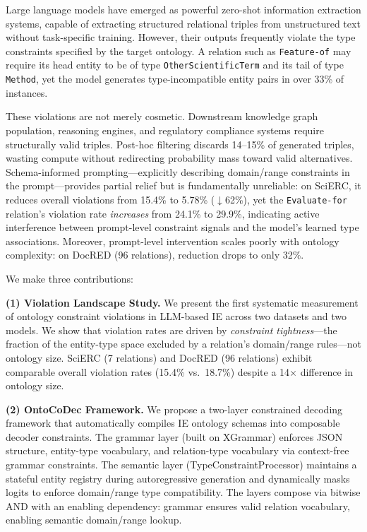 \documentclass[11pt,a4paper]{article}
\newcommand{\sys}{OntoCoDec}
\begin{document}
Large language models have emerged as powerful zero-shot information extraction systems, capable of extracting structured relational triples from unstructured text without task-specific training.
However, their outputs frequently violate the type constraints specified by the target ontology.
A relation such as \texttt{Feature-of} may require its head entity to be of type \texttt{OtherScientificTerm} and its tail of type \texttt{Method}, yet the model generates type-incompatible entity pairs in over 33\% of instances.

These violations are not merely cosmetic. Downstream knowledge graph population, reasoning engines, and regulatory compliance systems require structurally valid triples.
Post-hoc filtering discards 14--15\% of generated triples, wasting compute without redirecting probability mass toward valid alternatives.
Schema-informed prompting---explicitly describing domain/range constraints in the prompt---provides partial relief but is fundamentally unreliable: on SciERC, it reduces overall violations from 15.4\% to 5.78\% ($\downarrow$62\%), yet the \texttt{Evaluate-for} relation's violation rate \emph{increases} from 24.1\% to 29.9\%, indicating active interference between prompt-level constraint signals and the model's learned type associations.
Moreover, prompt-level intervention scales poorly with ontology complexity: on DocRED (96 relations), reduction drops to only 32\%.

We make three contributions:

\noindent\textbf{(1) Violation Landscape Study.}
We present the first systematic measurement of ontology constraint violations in LLM-based IE across two datasets and two models.
We show that violation rates are driven by \emph{constraint tightness}---the fraction of the entity-type space excluded by a relation's domain/range rules---not ontology size.
SciERC (7 relations) and DocRED (96 relations) exhibit comparable overall violation rates (15.4\% vs.\ 18.7\%) despite a 14$\times$ difference in ontology size.

\noindent\textbf{(2) \sys{} Framework.}
We propose a two-layer constrained decoding framework that automatically compiles IE ontology schemas into composable decoder constraints.
The grammar layer (built on XGrammar) enforces JSON structure, entity-type vocabulary, and relation-type vocabulary via context-free grammar constraints.
The semantic layer (TypeConstraintProcessor) maintains a stateful entity registry during autoregressive generation and dynamically masks logits to enforce domain/range type compatibility.
The layers compose via bitwise AND with an enabling dependency: grammar ensures valid relation vocabulary, enabling semantic domain/range lookup.
\end{document}
